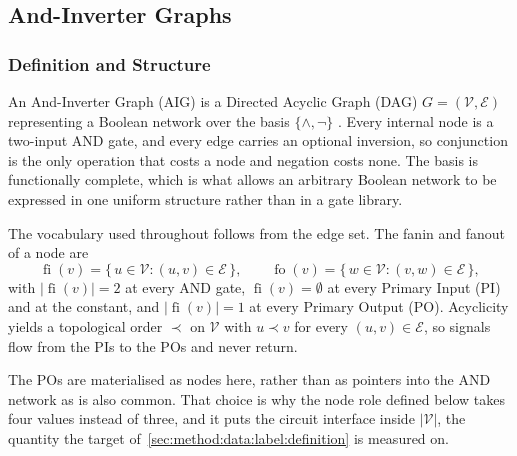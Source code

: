 \subsection{And-Inverter Graphs}
\label{sec:prelim:aig}

\subsubsection{Definition and Structure}
\label{sec:prelim:aig:definition}
An And-Inverter Graph (AIG) is a Directed Acyclic Graph (DAG) $G = (\mathcal{V}, \mathcal{E})$
representing a Boolean network over the basis $\{\wedge, \neg\}$
\citep{mishchenko2006rewriting}. Every internal node is a two-input AND gate, and every edge
carries an optional inversion, so conjunction is the only operation that costs a node and
negation costs none. The basis is functionally complete, which is what allows an arbitrary
Boolean network to be expressed in one uniform structure rather than in a gate library.

The vocabulary used throughout follows from the edge set. The fanin and fanout of a node are
\begin{equation}
    \operatorname{fi}(v) = \{\, u \in \mathcal{V} : (u, v) \in \mathcal{E} \,\},
    \qquad
    \operatorname{fo}(v) = \{\, w \in \mathcal{V} : (v, w) \in \mathcal{E} \,\},
    \label{eq:prelim:fanin}
\end{equation}
with $|\operatorname{fi}(v)| = 2$ at every AND gate, $\operatorname{fi}(v) = \emptyset$ at
every Primary Input (PI) and at the constant, and $|\operatorname{fi}(v)| = 1$ at every
Primary Output (PO). Acyclicity yields a topological order $\prec$ on $\mathcal{V}$
with $u \prec v$ for every $(u, v) \in \mathcal{E}$, so signals flow from the PIs to the
POs and never return.

The POs are materialised as nodes here, rather than as pointers into the AND network as is
also common. That choice is why the node role defined below takes four values instead of
three, and it puts the circuit interface inside $|\mathcal{V}|$, the quantity the target
of~\ref{sec:method:data:label:definition} is measured on.

